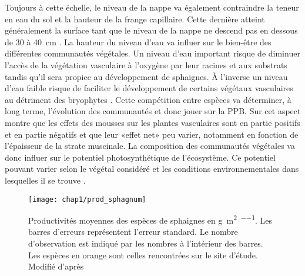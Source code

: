 Toujours à cette échelle, le niveau de la nappe va également contraindre la teneur en eau du sol et la hauteur de la frange capillaire.
Cette dernière atteint généralement la surface tant que le niveau de la nappe ne descend pas en dessous de \num{30} à \SI{40}{\centi\metre} \citep{laiho2006}.
La hauteur du niveau d'eau va influer sur le bien-être des différentes communautés végétales.
Un niveau d'eau important risque de diminuer l'accès de la végétation vasculaire à l'oxygène par leur racines et aux substrats tandis qu'il sera propice au développement de sphaignes.
À l'inverse un niveau d'eau faible risque de faciliter le développement de certains végétaux vasculaires au détriment des bryophytes \plop.
Cette compétition entre espèces va déterminer, à long terme, l'évolution des communautés et donc jouer sur la PPB.
Sur cet aspect \citet{gornall2011} montre que les effets des mousses sur les plantes vasculaires sont en partie positifs et en partie négatifs et que leur «effet net» peu varier, notamment en fonction de l'épaisseur de la strate muscinale.
La composition des communautés végétales va donc influer sur le potentiel photosynthétique de l'écosystème.
Ce potentiel pouvant varier selon le végétal considéré et les conditions environnementales dans lesquelles il se trouve \citep{moore2002}.

\begin{figure}
\centering
\texttt{[image: chap1/prod\_sphagnum]}
\caption{Productivités moyennes des espèces de sphaignes en \si{\gram\per\square\metre\per\year}. Les barres d'erreurs représentent l'erreur standard. Le nombre d'observation est indiqué par les nombres à l'intérieur des barres. Les espèces en orange sont celles rencontrées sur le site d'étude. Modifié d'après \citet{gunnarsson2005}}
\label{fig:prod_sphagnum}
\end{figure}

